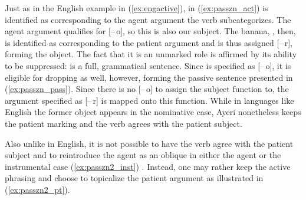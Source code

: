 Just as in the English example in (\ref{ex:engactive}),  in
(\ref{ex:passzn_act}) is identified as corresponding to the agent argument the
verb  subcategorizes. The agent argument qualifies for
[–\,o], so this is also our subject. The banana, , then, is
identified as corresponding to the patient argument and is thus assigned
[–\,r], forming the object. The fact that it is an unmarked role is affirmed by
its ability to be suppressed:  is a full, grammatical sentence. Since  is specified
as [–\,o], it is eligible for dropping as well, however, forming the passive
sentence presented in (\ref{ex:passzn_pass}). Since there is no [–\,o] to
assign the subject function to, the argument specified as [–\,r] is mapped onto
this function. While in languages like English the former object appears in the
nominative case, Ayeri nonetheless keeps the patient marking and the verb
agrees with the patient subject.

Also unlike in English, it is not possible to have the verb agree with the
patient subject and to reintroduce the agent as an oblique in either the agent
or the instrumental case (\ref{ex:passzn2_inst}) \parencite[for English,
compare][416]{needhamtoivonen2011}. Instead, one may rather keep the active
phrasing and choose to topicalize the patient argument as illustrated in
(\ref{ex:passzn2_pt}).

